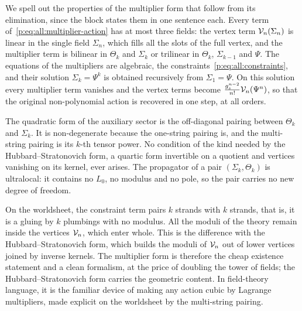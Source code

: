 We spell out the properties of the multiplier form that follow from its elimination, since the block states them in one sentence each.
Every term of~\eqref{p:eq:all:multiplier-action} has at most three fields: the vertex term $\mathcal{V}_{n}(\Sigma_n)$ is linear in the single field $\Sigma_n$, which fills all the slots of the full vertex, and the multiplier term is bilinear in $\Theta_k$ and $\Sigma_k$ or trilinear in $\Theta_k$, $\Sigma_{k - 1}$ and $\Psi$.
The equations of the multipliers are algebraic, the constraints~\eqref{p:eq:all:constraints}, and their solution $\Sigma_k = \Psi^k$ is obtained recursively from $\Sigma_1 = \Psi$.
On this solution every multiplier term vanishes and the vertex terms become $\frac{g_s^{n - 2}}{n!} \mathcal{V}_{n}(\Psi^n)$, so that the original non-polynomial action is recovered in one step, at all orders.

The quadratic form of the auxiliary sector is the off-diagonal pairing between $\Theta_k$ and $\Sigma_k$.
It is non-degenerate because the one-string pairing is, and the multi-string pairing is its $k$-th tensor power.
No condition of the kind needed by the Hubbard--Stratonovich form, a quartic form invertible on a quotient and vertices vanishing on its kernel, ever arises.
The propagator of a pair $(\Sigma_k, \Theta_k)$ is ultralocal: it contains no $L_0$, no modulus and no pole, so the pair carries no new degree of freedom.

On the worldsheet, the constraint term pairs $k$ strands with $k$ strands, that is, it is a gluing by $k$ plumbings with no modulus.
All the moduli of the theory remain inside the vertices $\mathcal{V}_{n}$, which enter whole.
This is the difference with the Hubbard--Stratonovich form, which builds the moduli of $\mathcal{V}_{n}$ out of lower vertices joined by inverse kernels.
The multiplier form is therefore the cheap existence statement and a clean formalism, at the price of doubling the tower of fields; the Hubbard--Stratonovich form carries the geometric content.
In field-theory language, it is the familiar device of making any action cubic by Lagrange multipliers, made explicit on the worldsheet by the multi-string pairing.

